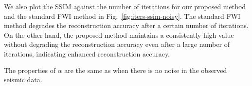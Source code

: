 We also plot the SSIM against the number of iterations for our proposed method and the standard FWI method in Fig.~\ref{fig:iters-ssim-noisy}.
The standard FWI method degrades the reconstruction accuracy after a certain number of iterations.
On the other hand, the proposed method maintains a consistently high value without degrading the reconstruction accuracy even after a large number of iterations, indicating enhanced reconstruction accuracy.

The properties of $\alpha$ are the same as when there is no noise in the observed seismic data.
